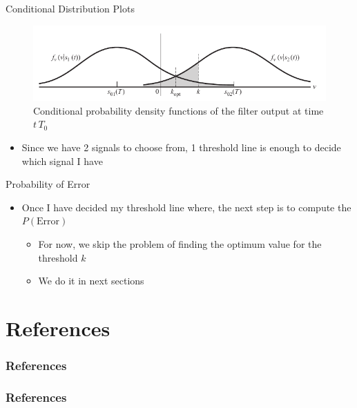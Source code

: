 \documentclass{Beamer}
\begin{document}
\begin{frame}[t]{Conditional Distribution Plots}

\begin{figure}[h]
\centering
\includegraphics[scale=0.8]{Figures/Baseband_Binary/conditional_distribution_plots}
\caption{Conditional probability density functions of the filter output at time $t \, T_0$}
\label{fig:Baseband_Binary:conditional_distribution_plots}
\end{figure}

\begin{itemize}

\item Since we have 2 signals to choose from, 1 threshold line is enough to decide which signal I have

\end{itemize}

\end{frame}

\begin{frame}[t]{Probability of Error}

\begin{itemize}

\item Once I have decided my threshold line where, the next step is to compute the $P(\text{Error})$

	\begin{itemize}
	\item For now, we skip the problem of finding the optimum value for the threshold $k$
	
	\item We do it in next sections
	\end{itemize}
	 

\end{itemize}

\end{frame}


\section{References}


\begin{frame}[allowframebreaks]
\frametitle{References}


\frametitle{References}


\end{frame}
\end{document}
